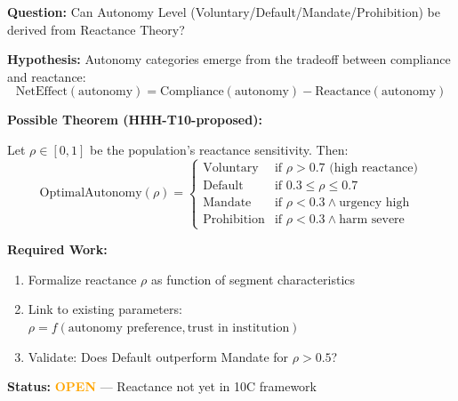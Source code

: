 \begin{tcolorbox}[colback=yellow!5!white, colframe=yellow!75!black,
    title=\textbf{Research Question RQ-2: Autonomy Emergence (F8)}]

\textbf{Question:} Can Autonomy Level (Voluntary/Default/Mandate/Prohibition) be derived from Reactance Theory?

\textbf{Hypothesis:} Autonomy categories emerge from the tradeoff between compliance and reactance:
\begin{equation}
\text{NetEffect}(\text{autonomy}) = \text{Compliance}(\text{autonomy}) - \text{Reactance}(\text{autonomy})
\end{equation}

\textbf{Possible Theorem (HHH-T10-proposed):}

Let $\rho \in [0,1]$ be the population's reactance sensitivity. Then:
\begin{equation}
\text{OptimalAutonomy}(\rho) = \begin{cases}
\text{Voluntary} & \text{if } \rho > 0.7 \text{ (high reactance)} \\
\text{Default} & \text{if } 0.3 \leq \rho \leq 0.7 \\
\text{Mandate} & \text{if } \rho < 0.3 \wedge \text{urgency high} \\
\text{Prohibition} & \text{if } \rho < 0.3 \wedge \text{harm severe}
\end{cases}
\end{equation}

\textbf{Required Work:}
\begin{enumerate}[nosep]
    \item Formalize reactance $\rho$ as function of segment characteristics
    \item Link to existing parameters: $\rho = f(\text{autonomy preference}, \text{trust in institution})$
    \item Validate: Does Default outperform Mandate for $\rho > 0.5$?
\end{enumerate}

\textbf{Status:} \textcolor{orange}{\textbf{OPEN}} --- Reactance not yet in 10C framework
\end{tcolorbox}

